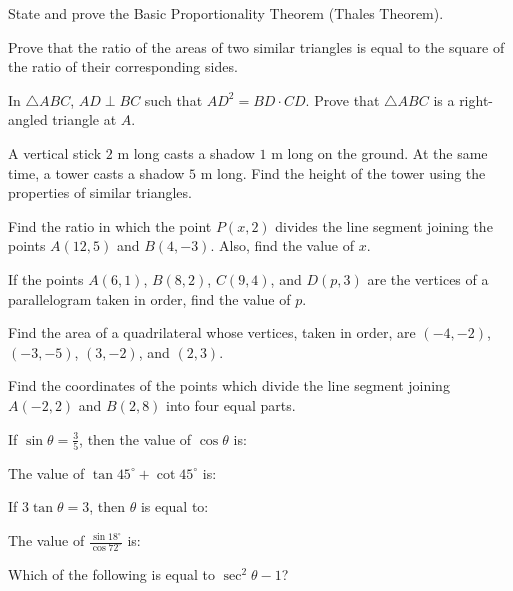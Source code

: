 \documentclass[12pt,a4paper]{exam}
\begin{document}
\begin{questions}
\question[5] State and prove the Basic Proportionality Theorem (Thales Theorem).
\vspace{0.15cm}

\question[5] Prove that the ratio of the areas of two similar triangles is equal to the square of the ratio of their corresponding sides.
\vspace{0.15cm}

\question[5] In $\triangle ABC$, $AD \perp BC$ such that $AD^2 = BD \cdot CD$. Prove that $\triangle ABC$ is a right-angled triangle at $A$.
\vspace{0.15cm}

\question[5] A vertical stick $2$ m long casts a shadow $1$ m long on the ground. At the same time, a tower casts a shadow $5$ m long. Find the height of the tower using the properties of similar triangles.
\vspace{0.15cm}

\question[5] Find the ratio in which the point $P(x, 2)$ divides the line segment joining the points $A(12, 5)$ and $B(4, -3)$. Also, find the value of $x$.
\vspace{0.15cm}

\question[5] If the points $A(6, 1)$, $B(8, 2)$, $C(9, 4)$, and $D(p, 3)$ are the vertices of a parallelogram taken in order, find the value of $p$.
\vspace{0.15cm}

\question[5] Find the area of a quadrilateral whose vertices, taken in order, are $(-4, -2)$, $(-3, -5)$, $(3, -2)$, and $(2, 3)$.
\vspace{0.15cm}

\question[5] Find the coordinates of the points which divide the line segment joining $A(-2, 2)$ and $B(2, 8)$ into four equal parts.
\vspace{0.15cm}

\question[1] If $\sin \theta = \frac{3}{5}$, then the value of $\cos \theta$ is:
\vspace{0.15cm}

\question[1] The value of $\tan 45^\circ + \cot 45^\circ$ is:
\vspace{0.15cm}

\question[1] If $3\tan \theta = 3$, then $\theta$ is equal to:
\vspace{0.15cm}

\question[1] The value of $\frac{\sin 18^\circ}{\cos 72^\circ}$ is:
\vspace{0.15cm}

\question[1] Which of the following is equal to $\sec^2 \theta - 1$?
\vspace{0.15cm}

\end{questions}
\bigskip
\end{document}
